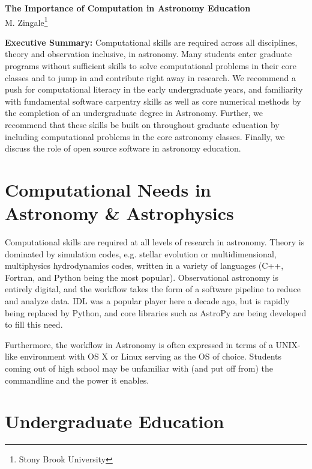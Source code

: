\documentclass[11pt]{article}
\begin{document}
\thispagestyle{plain}

\begin{center}
{\Large \sffamily \bfseries The Importance of Computation in Astronomy Education} \\
{M. Zingale\footnote{Stony Brook University}}
\end{center}

\begin{tcolorbox}
{\sffamily \bfseries Executive Summary:} Computational skills are required
across all disciplines, theory and observation inclusive, in astronomy.
Many students enter graduate programs without sufficient skills
to solve computational problems in their core classes and to jump in and
contribute right away in research.  We recommend a push for computational
literacy in the early undergraduate years, and familiarity with fundamental 
software carpentry skills as well as core numerical methods by the
completion of an undergraduate degree in Astronomy. Further, we recommend
that these skills be built on throughout graduate education by including
computational problems in the core astronomy classes.  Finally, we discuss
the role of open source software in astronomy education.
\end{tcolorbox}

\section{Computational Needs in Astronomy \& Astrophysics}

Computational skills are required at all levels of research in
astronomy.  Theory is dominated by simulation codes, e.g. stellar
evolution or multidimensional, multiphysics hydrodynamics codes,
written in a variety of languages (C++, Fortran, and Python being the
most popular).  Observational astronomy is entirely digital, and the
workflow takes the form of a software pipeline to reduce and analyze
data.  IDL was a popular player here a decade ago, but is rapidly
being replaced by Python, and core libraries such as AstroPy are being
developed to fill this need.

Furthermore, the workflow in Astronomy is often expressed in terms of
a UNIX-like environment with OS X or Linux serving as the OS of
choice.  Students coming out of high school may be unfamiliar with
(and put off from) the commandline and the power it enables.

\section{Undergraduate Education}
\end{document}
